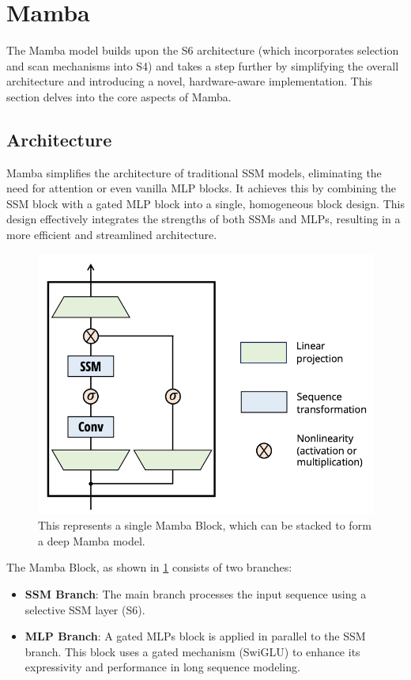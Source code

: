 \documentclass[12pt,a4paper]{report}
\begin{document}
\section{Mamba}

The Mamba model \cite{mamba} builds upon the S6 architecture (which incorporates selection and scan mechanisms into S4) and takes a step further by simplifying the overall architecture and introducing a novel, hardware-aware implementation. This section delves into the core aspects of Mamba.

\subsection{Architecture}

Mamba simplifies the architecture of traditional SSM models, eliminating the need for attention or even vanilla MLP blocks. It achieves this by combining the SSM block with a gated MLP block into a single, homogeneous block design. This design effectively integrates the strengths of both SSMs and MLPs, resulting in a more efficient and streamlined architecture.

\begin{figure}[ht]
    \centerline{\includegraphics[scale=0.6]{C4.2.1_Mamba_Arch.png}}
    \caption{This represents a single Mamba Block, which can be stacked to form a deep Mamba model.}
    \label{mamba-arch}
\end{figure}

The Mamba Block, as shown in \ref{mamba-arch} consists of two branches:
\begin{itemize}
    \item \textbf{SSM Branch}: The main branch processes the input sequence using a selective SSM layer (S6).
    \item \textbf{MLP Branch}: A gated MLPs block is applied in parallel to the SSM branch. This block uses a gated mechanism (SwiGLU) to enhance its expressivity and performance in long sequence modeling.
\end{itemize}
\end{document}
